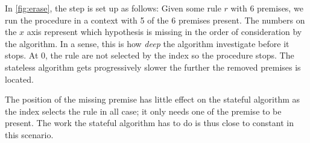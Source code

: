 \documentclass[runningheads]{llncs}
\newcommand{\xcom}[1]{{\color{cyan}{Xavier: #1}} }
\begin{document}
In \ref{fig:erase}, the step is set up as follows: 
Given some rule $r$ with $6$ \xcom{motivate 6} premises, 
we run the procedure in a context with 5 of the 6 premises present.
The numbers on the $x$ axis represent which hypothesis is missing
in the order of consideration by the algorithm.
In a sense, this is how \textit{deep} the algorithm investigate before
it stops.
At $0$, the rule are not selected by the index so the procedure stops.
The stateless algorithm gets progressively slower the further the removed
premises is located.

The position of the missing premise has little effect on the stateful
algorithm as the index selects the rule in all case; it only needs one
of the premise to be present.
The work the stateful algorithm has to do is thus close to constant
in this scenario.



\begin{figure}
\end{figure}
\end{document}
